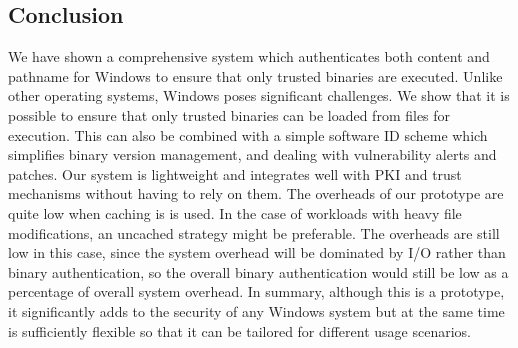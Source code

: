 \subsection{Conclusion}
\label{sec:binauth-conc}

We have shown a comprehensive system which authenticates both content and pathname
for Windows to ensure that only trusted binaries are executed. 
Unlike other operating systems, Windows poses significant challenges.
We show that it is possible to ensure that only trusted binaries can be loaded
from files for execution. 
This can also be combined with a simple software ID
scheme which simplifies binary version management, and dealing
with vulnerability alerts and patches.
Our system is lightweight and integrates well with PKI and 
trust mechanisms without
having to rely on them.
The overheads of our prototype are quite low when caching is is used.
In the case of workloads with heavy file modifications, an uncached strategy might be preferable.
The overheads are still low in this case, since the system overhead
will be dominated by I/O rather than binary authentication, so the overall binary authentication
would still be low as a percentage of overall system overhead. 
In summary, although this is a prototype, it significantly adds
to the security of any Windows system but at the same time is sufficiently
flexible so that it can be tailored for different usage scenarios.

